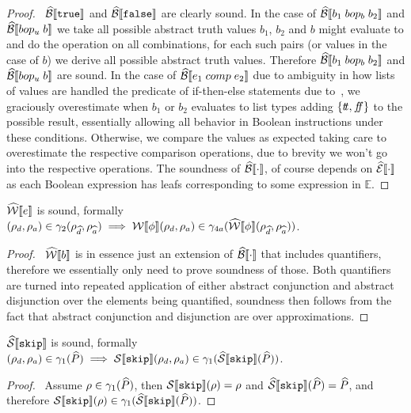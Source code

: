 \begin{proof}
    \pfsketch\
    $\widehat{\mathcal{B}}\llbracket \texttt{true} \rrbracket$ and $\widehat{\mathcal{B}}\llbracket \texttt{false} \rrbracket$ are clearly sound.
    In the case of $\widehat{\mathcal{B}}\llbracket b_1 \; bop_b \; b_2 \rrbracket$ and $\widehat{\mathcal{B}}\llbracket bop_u \; b \rrbracket$ we take all possible abstract truth values $b_1$, $b_2$ and $b$ might evaluate to and do the operation on all combinations, for each such pairs (or values in the case of $b$) we derive all possible abstract truth values.
    Therefore $\widehat{\mathcal{B}}\llbracket b_1 \; bop_b \; b_2 \rrbracket$ and $\widehat{\mathcal{B}}\llbracket bop_u \; b \rrbracket$ are sound.
    In the case of $\widehat{\mathcal{B}}\llbracket e_1 \; comp \; e_2 \rrbracket$ due to ambiguity in how lists of values are handled the predicate of if-then-else statements due to~\cite{halder_abstract_2012}, we graciously overestimate when $b_1$ or $b_2$ evaluates to list types adding $\{t\!t, f\!\!f\}$ to the possible result, essentially allowing all behavior in Boolean instructions under these conditions.
    Otherwise, we compare the values as expected taking care to overestimate the respective comparison operations, due to brevity we won't go into the respective operations.
    The soundness of $\widehat{\mathcal{B}}\llbracket \cdot \rrbracket$, of course depends on $\widehat{\mathcal{E}}\llbracket \cdot \rrbracket$ as each Boolean expression has leafs corresponding to some expression in $\mathbb{E}$.
\end{proof}


\begin{conjecture}\label{thm:sound-exp}
    $\widehat{\mathcal{W}}\llbracket e \rrbracket$ is sound, formally $(\rho_d, \rho_a) \in \gamma_2(\rho_{\widehat{d}}, \rho_{\widehat{a}}) \implies \mathcal{W}\llbracket \phi \rrbracket(\rho_d, \rho_a) \in \gamma_{4a}(\widehat{\mathcal{W}}\llbracket \phi \rrbracket(\rho_{\widehat{d}}, \rho_{\widehat{a}}))$.
\end{conjecture}


\begin{proof}
    \pfsketch\
    $\widehat{\mathcal{W}}\llbracket b \rrbracket$ is in essence just an extension of $\widehat{\mathcal{B}}\llbracket \cdot \rrbracket$ that includes quantifiers, therefore we essentially only need to prove soundness of those.
    Both quantifiers are turned into repeated application of either abstract conjunction and abstract disjunction over the elements being quantified, soundness then follows from the fact that abstract conjunction and disjunction are over approximations.
\end{proof}


\begin{conjecture}\label{thm:sound-skip}
    $\widehat{\mathcal{S}} \llbracket \texttt{skip} \rrbracket$ is sound, formally $(\rho_d, \rho_a) \in \gamma_1(\widehat{P}) \implies \mathcal{S} \llbracket \texttt{skip} \rrbracket(\rho_d, \rho_a) \in \gamma_1(\widehat{\mathcal{S}} \llbracket \texttt{skip} \rrbracket(\widehat{P}))$.
\end{conjecture}
\begin{proof}
    \pf\ Assume $\rho \in \gamma_1(\widehat{P})$, then $\mathcal{S} \llbracket \texttt{skip} \rrbracket(\rho) = \rho$ and $\widehat{\mathcal{S}} \llbracket \texttt{skip} \rrbracket(\widehat{P}) = \widehat{P}$, and therefore $\mathcal{S} \llbracket \texttt{skip} \rrbracket(\rho) \in \gamma_1(\widehat{\mathcal{S}} \llbracket \texttt{skip} \rrbracket(\widehat{P}))$.
\end{proof}


